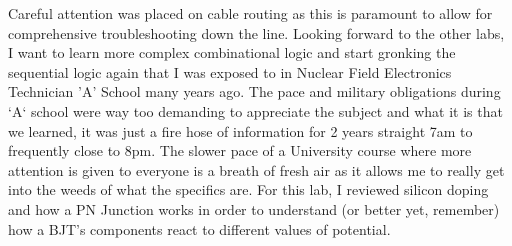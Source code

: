 \documentclass[12pt]{report}
\begin{document}
Careful attention was placed on cable routing as this is paramount to allow for comprehensive troubleshooting down the line. Looking forward to the other labs, I want to learn more complex combinational logic and start gronking the sequential logic again that I was exposed to in Nuclear Field Electronics Technician 'A' School many years ago. The pace and military obligations during `A` school were way too demanding to appreciate the subject and what it is that we learned, it was just a fire hose of information for 2 years straight 7am to frequently close to 8pm. The slower pace of a University course where more attention is given to everyone is a breath of fresh air as it allows me to really get into the weeds of what the specifics are. For this lab, I reviewed silicon doping and how a PN Junction works in order to understand (or better yet, remember) how a BJT's components react to different values of potential.
\end{document}
